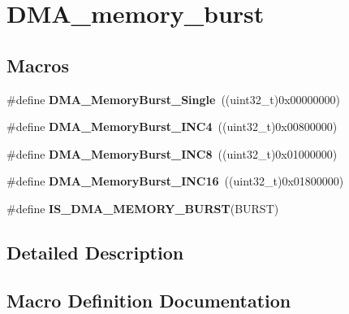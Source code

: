 \hypertarget{group___d_m_a__memory__burst}{}\section{D\+M\+A\+\_\+memory\+\_\+burst}
\label{group___d_m_a__memory__burst}
\subsection*{Macros}
\begin{DoxyCompactItemize}
\item 
\hypertarget{group___d_m_a__memory__burst_gab3353b3a85b555f826fe567ce68c3fc3}{}\#define {\bfseries D\+M\+A\+\_\+\+Memory\+Burst\+\_\+\+Single}~((uint32\+\_\+t)0x00000000)\label{group___d_m_a__memory__burst_gab3353b3a85b555f826fe567ce68c3fc3}

\item 
\hypertarget{group___d_m_a__memory__burst_gacf7f57731c663fdc6ca8a6fb18ff31b0}{}\#define {\bfseries D\+M\+A\+\_\+\+Memory\+Burst\+\_\+\+I\+N\+C4}~((uint32\+\_\+t)0x00800000)\label{group___d_m_a__memory__burst_gacf7f57731c663fdc6ca8a6fb18ff31b0}

\item 
\hypertarget{group___d_m_a__memory__burst_ga33aca825c5a81e83753ff6fadb3634c0}{}\#define {\bfseries D\+M\+A\+\_\+\+Memory\+Burst\+\_\+\+I\+N\+C8}~((uint32\+\_\+t)0x01000000)\label{group___d_m_a__memory__burst_ga33aca825c5a81e83753ff6fadb3634c0}

\item 
\hypertarget{group___d_m_a__memory__burst_ga4ffd4960f794b187229fac1cea3d81c9}{}\#define {\bfseries D\+M\+A\+\_\+\+Memory\+Burst\+\_\+\+I\+N\+C16}~((uint32\+\_\+t)0x01800000)\label{group___d_m_a__memory__burst_ga4ffd4960f794b187229fac1cea3d81c9}

\item 
\#define {\bfseries I\+S\+\_\+\+D\+M\+A\+\_\+\+M\+E\+M\+O\+R\+Y\+\_\+\+B\+U\+R\+S\+T}(B\+U\+R\+S\+T)
\end{DoxyCompactItemize}


\subsection{Detailed Description}


\subsection{Macro Definition Documentation}
\hypertarget{group___d_m_a__memory__burst_ga921ebf06447dc036180fff50b7e4846a}{}
